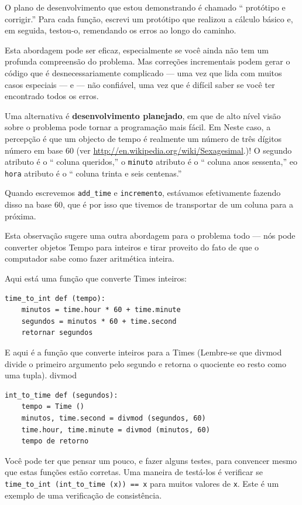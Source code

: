 \documentclass[10pt]{book}
\begin{document}
\begin{v erbatim}
{O plano de desenvolvimento que estou demonstrando é chamado `` protótipo e
corrigir.'' Para cada função, escrevi um protótipo que realizou a
cálculo básico e, em seguida, testou-o, remendando os erros ao longo do
caminho.

Esta abordagem pode ser eficaz, especialmente se você ainda não tem um
profunda compreensão do problema. Mas correções incrementais podem
gerar o código que é desnecessariamente complicado --- uma vez que lida com
muitos casos especiais --- e --- não confiável, uma vez que é difícil saber se você
ter encontrado todos os erros.

Uma alternativa é {\bf desenvolvimento planejado}, em que de alto nível
visão sobre o problema pode tornar a programação mais fácil. Em
Neste caso, a percepção é que um objecto de tempo é realmente um número de três dígitos
número em base 60 (ver \url{http://en.wikipedia.org/wiki/Sexagesimal}.)! O
{\tt} segundo atributo é o `` coluna queridos,'' o {\tt minuto}
atributo é o `` coluna anos sessenta,'' eo {\tt hora} atributo é
o `` coluna trinta e seis centenas.''

Quando escrevemos \verb "add_time" e {\tt incremento}, estávamos efetivamente
fazendo disso na base 60, que é por isso que tivemos de transportar de um
coluna para a próxima.

Esta observação sugere uma outra abordagem para o problema todo --- nós
pode converter objetos Tempo para inteiros e tirar proveito do fato de
que o computador sabe como fazer aritmética inteira.  

Aqui está uma função que converte Times inteiros:

\begin{verbatim}
time_to_int def (tempo):
    minutos = time.hour * 60 + time.minute
    segundos = minutos * 60 + time.second
    retornar segundos
\end{verbatim}
%
E aqui é a função que converte inteiros para a Times
(Lembre-se que {divmod \tt} divide o primeiro argumento pelo segundo
e retorna o quociente eo resto como uma tupla).
\index{} divmod

\begin{verbatim}
int_to_time def (segundos):
    tempo = Time ()
    minutos, time.second = divmod (segundos, 60)
    time.hour, time.minute = divmod (minutos, 60)
    tempo de retorno
\end{verbatim}
%
Você pode ter que pensar um pouco, e fazer alguns testes, para convencer
mesmo que estas funções estão corretas. Uma maneira de testá-los é
verificar se \verb "time_to_int (int_to_time (x)) == x" para muitos valores de
{\tt x}. Este é um exemplo de uma verificação de consistência.

}
\end{v erbatim}
\end{document}
